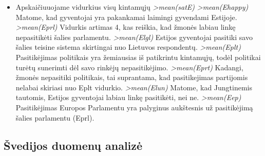 \documentclass[12pt,a4paper]{article}
\theoremstyle{change}\newtheorem{salyga}{Uždavinys}
\begin{document}
\begin{itemize}
\item Apskaičiuuojame vidurkius visų kintamųjų
\newline \textit{ >mean(satE) 
   }
\newline \textit{ >mean(Ehappy) 
   }
\newline Matome, kad gyventojai yra pakankamai laimingi gyvendami Estijoje.
\newline \textit{ >mean(Eprl) 
   }
 \newline Vidurkis artimas 4, kas reiškia, kad žmonės labiau linkę nepasitikėti šalies parlamentu.
\newline \textit{ >mean(Elgl) 
   }
\newline  Estijos gyventojai pasitiki savo šalies teisine sistema skirtingai nuo Lietuvos respondentų.
\newline \textit{ >mean(Eplt) 
   }
\newline Pasitikėjimas politikais yra žemiausias iš patikrintu kintamųjų, todėl politikai turėtų sunerimti dėl savo rinkėjų nepasitikėjimo.
\newline \textit{ >mean(Eprt) 
   }
\newline Kadangi, žmonės nepasitiki politikais, tai suprantama, kad pasitikejimas partijomis nelabai skiriasi nuo Eplt vidurkio.
\newline \textit{ >mean(Elun) 
   }
\newline Matome, kad Jungtinemis tautomis, Estijos gyventojai labiau linkę pasitikėti, nei ne.
\newline \textit{ >mean(Eep) 
  }
\newline Pasitikėjimas Europos Parlamentu yra palyginus aukštesnis už pasitikėjimą šalies parlamentu (Eprl).

\end{itemize}


\subsection{Švedijos duomenų analizė}
\end{document}
